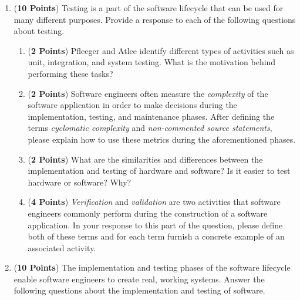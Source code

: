 \documentclass[12pt,epsf,psfig,graphics]{article}
\begin{document}
\begin{enumerate}
\newpage

\item ({\bf 10 Points}) Testing is a part of the software lifecycle
  that can be used for many different purposes.  Provide a response 
  to each of the following questions about testing.

\begin{enumerate}       
  
\item ({\bf 2 Points}) Pfleeger and Atlee identify different types of
  activities such as unit, integration, and system testing.  What is
  the motivation behind performing these tasks?


\item ({\bf 2 Points}) Software engineers often measure the {\em
  complexity} of the software application in order to make decisions
  during the implementation, testing, and maintenance phases.  After
  defining the terms {\em cyclomatic complexity} and {\em
    non-commented source statements}, please explain how to use these
  metrics during the aforementioned phases.
  
\item ({\bf 2 Points}) What are the similarities and differences
  between the implementation and testing of hardware and software?  Is
  it easier to test hardware or software?  Why?

\item ({\bf 4 Points}) {\em Verification} and {\em validation} are two
  activities that software engineers commonly perform during the
  construction of a software application.  In your response to this
  part of the question, please define both of these terms and for each
  term furnish a concrete example of an associated activity.
  
\end{enumerate}

\newpage

\item ({\bf 10 Points}) The implementation and testing phases of the
  software lifecycle enable software engineers to create real, working
  systems.  Answer the following questions about the implementation
  and testing of software.


\end{enumerate}
\end{document}
